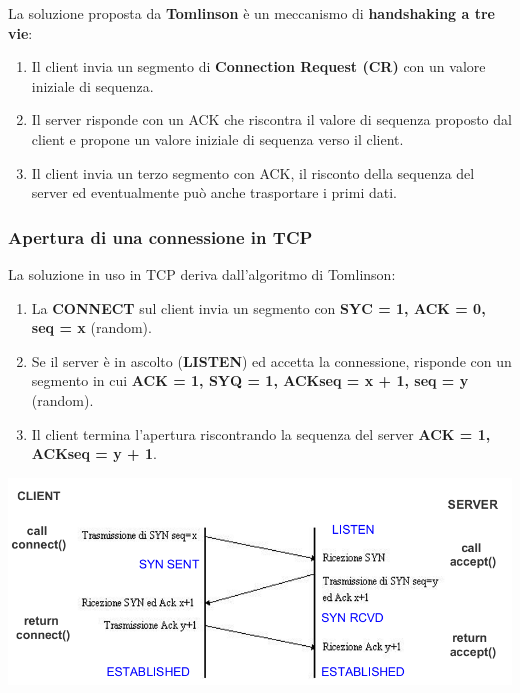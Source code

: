             La soluzione proposta da \textbf{Tomlinson} è un meccanismo di \textbf{handshaking a tre vie}:
            \begin{enumerate}
                \item Il client invia un segmento di \textbf{Connection Request (CR)} con un valore iniziale di sequenza.
                \item Il server risponde con un ACK che riscontra il valore di sequenza proposto dal client e propone un valore iniziale di sequenza verso il client.
                \item Il client invia un terzo segmento con ACK, il risconto della sequenza del server ed eventualmente può anche trasportare i primi dati.
            \end{enumerate}

        \subsubsection{Apertura di una connessione in TCP}
            La soluzione in uso in TCP deriva dall'algoritmo di Tomlinson:
            \begin{enumerate}
                \item La \textbf{CONNECT} sul client invia un segmento con \textbf{SYC = 1, ACK = 0, seq = x} (random).
                \item Se il server è in ascolto (\textbf{LISTEN}) ed accetta la connessione, risponde con
                un segmento in cui \textbf{ACK = 1, SYQ = 1, ACKseq = x + 1, seq = y} (random).
                \item Il client termina l'apertura riscontrando la sequenza del server \textbf{ACK = 1, ACKseq = y + 1}.
            \end{enumerate}

            \begin{center}
                \includegraphics[scale=0.37]{chapters/5/assets/schema_h.png}
            \end{center}


